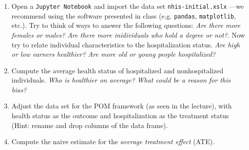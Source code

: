 \begin{enumerate}[\itshape i.)]
  \item Open a \texttt{Jupyter Notebook} and import the data set \texttt{nhis-initial.xslx} ---we recommend using the software presented in class (e.g. \texttt{pandas}, \texttt{matplotlib}, etc.).
    Try to think of ways to answer the following questions: \emph{Are there more females or males?} \emph{Are there more inidividuals who hold a degree or not?}.
    Now try to relate individual characteristics to the hospitalization status. \emph{Are high or low earners healthier?} \emph{Are more old or young people hospitalized?}

  \item Compute the average health status of hospitalized and nonhospitalized individuals. \emph{Who is healthier on average?} \emph{What could be a reason for this bias?}

  \item Adjust the data set for the POM framework (as seen in the lecture), with health status as the outcome and hospitalization as the treatment status (Hint: rename and drop columns of the data frame).

  \item Compute the naive estimate for the \emph{average treatment effect} (ATE).
\end{enumerate}


\subsection{}

